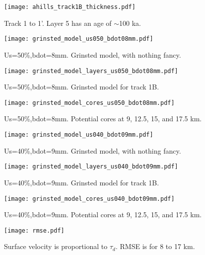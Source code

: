 \documentclass[11pt, oneside]{article}   	%
\begin{document}


\begin{figure}
	\centerline{\texttt{[image: ahills\_track1B\_thickness.pdf]}}
	\caption{Track 1 to 1'. Layer 5 has an age of $\sim$100 ka.}
\end{figure}

\begin{figure}
	\centerline{\texttt{[image: grinsted\_model\_us050\_bdot08mm.pdf]}}
	\caption{Us=50\%,bdot=8mm. Grinsted model, with nothing fancy.}

	\centerline{\texttt{[image: grinsted\_model\_layers\_us050\_bdot08mm.pdf]}}
	\caption{Us=50\%,bdot=8mm. Grinsted model for track 1B.}
\end{figure}
\begin{figure}
	\centerline{\texttt{[image: grinsted\_model\_cores\_us050\_bdot08mm.pdf]}}
	\caption{Us=50\%,bdot=8mm. Potential cores at 9, 12.5, 15, and 17.5 km.}
\end{figure}

\begin{figure}
	\centerline{\texttt{[image: grinsted\_model\_us040\_bdot09mm.pdf]}}
	\caption{Us=40\%,bdot=9mm. Grinsted model, with nothing fancy.}

	\centerline{\texttt{[image: grinsted\_model\_layers\_us040\_bdot09mm.pdf]}}
	\caption{Us=40\%,bdot=9mm. Grinsted model for track 1B.}
\end{figure}
\begin{figure}
	\centerline{\texttt{[image: grinsted\_model\_cores\_us040\_bdot09mm.pdf]}}
	\caption{Us=40\%,bdot=9mm. Potential cores at 9, 12.5, 15, and 17.5 km.}
\end{figure}

\begin{figure}
	\centerline{\texttt{[image: rmse.pdf]}}
	\caption{Surface velocity is proportional to $\tau_d$. RMSE is for 8 to 17 km.}
\end{figure}	
\end{document}
